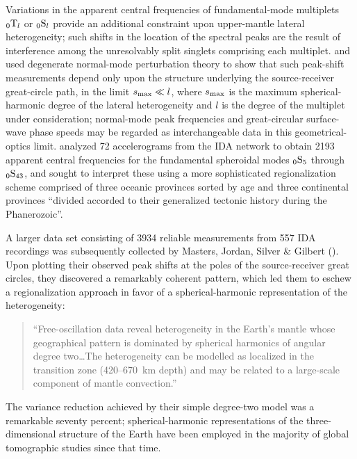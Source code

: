 %
Variations in the apparent central frequencies of fundamental-mode
multiplets ${}_0{\rm T}_l$ or ${}_0{\rm S}_l$ provide an additional
constraint upon upper-mantle lateral heterogeneity; such shifts in the
location of the spectral peaks are the result of interference
among the unresolvably split singlets comprising each multiplet.
\textcite{jordan78} and \textcite{dahlen79} used degenerate
normal-mode perturbation theory to show that such peak-shift
measurements depend only upon the structure underlying the
source-receiver great-circle path, in the limit $s_{\rm max}\ll l$,
where $s_{\rm max}$ is the maximum spherical-harmonic degree
of the lateral heterogeneity and $l$ is the degree of the
multiplet under consideration; normal-mode peak frequencies
and great-circular surface-wave phase speeds may be regarded
as interchangeable data in this geometrical-optics limit.
\textcite{silver&jordan81} analyzed 72 accelerograms from the
IDA network to obtain 2193 apparent central frequencies for the
fundamental spheroidal modes ${}_0{\rm S}_5$ through ${}_0{\rm S}_{43}$,
and sought to interpret these using a more sophisticated
regionalization scheme comprised of three oceanic provinces
sorted by age and three continental provinces ``divided
accorded to their generalized tectonic history during the
Phanerozoic''.

A larger data set consisting of 3934 reliable
measurements from 557 IDA recordings was subsequently collected
by Masters, Jordan, Silver \& Gilbert (\citeyear{masters&al82}).
Upon plotting their observed peak shifts at the poles of the source-receiver
great circles, they discovered a remarkably coherent pattern,
which led them to eschew a regionalization approach in favor
of a spherical-harmonic representation of the heterogeneity:
\begin{quote}
``Free-oscillation data reveal heterogeneity in the Earth's
mantle whose geographical pattern is dominated by spherical harmonics
of angular degree two\ldots The heterogeneity can be modelled
as localized in the transition zone (420--670~km depth) and may
be related to a large-scale component of mantle convection.''
\end{quote}
The variance reduction achieved by their simple degree-two
 model was a remarkable seventy percent; spherical-harmonic
representations of the three-dimensional structure of the
Earth have been employed in the majority of global tomographic
studies since that time.
%

